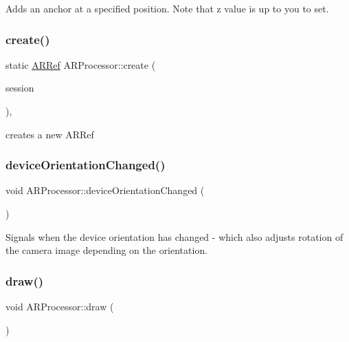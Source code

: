 Adds an anchor at a specified position. Note that z value is up to you to set. 

\mbox{\label{class_a_r_processor_affa1cf36e94e3015c436fd30626dd773}} 
\subsubsection{\texorpdfstring{create()}{create()}}
{\footnotesize\ttfamily static \mbox{\hyperlink{_a_r_processor_8h_aa8c5643290d0692cc71388c3f0f1623a}{A\+R\+Ref}} A\+R\+Processor\+::create (\begin{DoxyParamCaption}\item[{A\+R\+Session $\ast$}]{session }\end{DoxyParamCaption})\hspace{0.3cm}{\ttfamily [inline]}, {\ttfamily [static]}}



creates a new A\+R\+Ref 

\mbox{\label{class_a_r_processor_ac065970f90243b08b9d004a4220d0345}} 
\subsubsection{\texorpdfstring{device\+Orientation\+Changed()}{deviceOrientationChanged()}}
{\footnotesize\ttfamily void A\+R\+Processor\+::device\+Orientation\+Changed (\begin{DoxyParamCaption}{ }\end{DoxyParamCaption})}

Signals when the device orientation has changed -\/ which also adjusts rotation of the camera image depending on the orientation. \mbox{\label{class_a_r_processor_a20418bd305702c3346a109da9e1afcb0}} 
\subsubsection{\texorpdfstring{draw()}{draw()}}
{\footnotesize\ttfamily void A\+R\+Processor\+::draw (\begin{DoxyParamCaption}{ }\end{DoxyParamCaption})}



